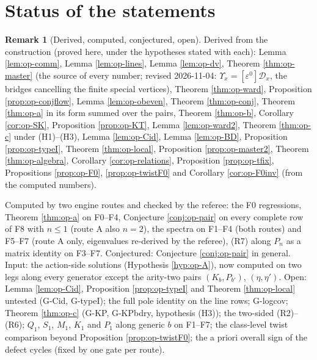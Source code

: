 \documentclass[11pt]{article}
\numberwithin{equation}{section}
\theoremstyle{plain}
\theoremstyle{definition}
\newtheorem{remark}[theorem]{Remark}
\begin{document}
\section{Status of the statements}
\label{sec:op-status}

\begin{remark}[Derived, computed, conjectured, open]
\label{rem:op-status}
Derived from the construction (proved here, under the hypotheses stated with each): Lemma \ref{lem:op-comm}, Lemma \ref{lem:op-lines}, Lemma \ref{lem:op-dv}, Theorem \ref{thm:op-master} (the source of every number; revised 2026-11-04: $\Upsilon_x=[\varepsilon^0]\mathcal D_x$, the bridges cancelling the finite special vertices), Theorem \ref{thm:op-ward}, Proposition \ref{prop:op-conjflow}, Lemma \ref{lem:op-obeven}, Theorem \ref{thm:op-conj}, Theorem \ref{thm:op-a} in its form summed over the pairs, Theorem \ref{thm:op-b}, Corollary \ref{cor:op-SK}, Proposition \ref{prop:op-KT}, Lemma \ref{lem:op-ward2}, Theorem \ref{thm:op-c} under (H1)--(H3), Lemma \ref{lem:op-Cid}, Lemma \ref{lem:op-BD}, Proposition \ref{prop:op-typeI}, Theorem \ref{thm:op-local}, Proposition \ref{prop:op-master2}, Theorem \ref{thm:op-algebra}, Corollary \ref{cor:op-relations}, Proposition \ref{prop:op-tfix}, Propositions \ref{prop:op-F0}, \ref{prop:op-twistF0} and Corollary \ref{cor:op-F0inv} (from the computed numbers).

Computed by two engine routes and checked by the referee: the F0 regressions, Theorem \ref{thm:op-a} on F0--F4, Conjecture \ref{conj:op-pair} on every complete row of F8 with $n\le1$ (route A also $n=2$), the spectra on F1--F4 (both routes) and F5--F7 (route A only, eigenvalues re-derived by the referee), (R7) along $P_n$ as a matrix identity on F3--F7. Conjectured: Conjecture \ref{conj:op-pair} in general. Input: the action-side solutions (Hypothesis \ref{hyp:op-A}), now computed on two legs along every generator except the arity-two pairs $(K_b,P_{b'})$, $(\eta,\eta')$. Open: Lemma \ref{lem:op-Cid}, Proposition \ref{prop:op-typeI} and Theorem \ref{thm:op-local} untested (G-Cid, G-typeI); the full pole identity on the line rows; G-logcov; Theorem \ref{thm:op-c} (G-KP, G-KPbdry, hypothesis (H3)); the two-sided (R2)--(R6); $Q_1$, $S_1$, $M_1$, $K_1$ and $P_1$ along generic $b$ on F1--F7; the class-level twist comparison beyond Proposition \ref{prop:op-twistF0}; the a priori overall sign of the defect cycles (fixed by one gate per route).


\end{remark}
\end{document}

